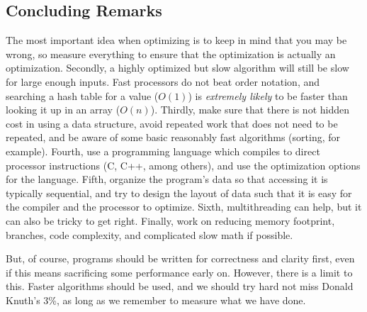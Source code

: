 \subsection{Concluding Remarks}

The most important idea when optimizing is to keep in mind that you may be wrong, so measure everything to ensure that the optimization
is actually an optimization. Secondly, a highly optimized but slow algorithm will still be slow for large enough inputs. Fast processors
do not beat order notation, and searching a hash table for a value ($O(1)$) is \textit{extremely likely} to be faster than looking it up
in an array ($O(n)$). Thirdly, make sure that there is not hidden cost in using a data structure, avoid repeated work that does not need to be repeated,
and be aware of some basic reasonably fast algorithms (sorting, for example). Fourth, use a programming language which compiles to direct processor
instructions (C, C++, among others), and use the optimization options for the language. Fifth, organize the program's data so that accessing it is
typically sequential, and try to design the layout of data such that it is easy for the compiler and the processor to optimize. Sixth, multithreading
can help, but it can also be tricky to get right. Finally, work on reducing memory footprint, branches, code complexity, and complicated slow
math if possible.

But, of course, programs should be written for correctness and clarity first, even if this means sacrificing some performance early on. However,
there is a limit to this. Faster algorithms should be used, and we should try hard not miss Donald Knuth's 3\%, as long as we remember to measure
what we have done.
